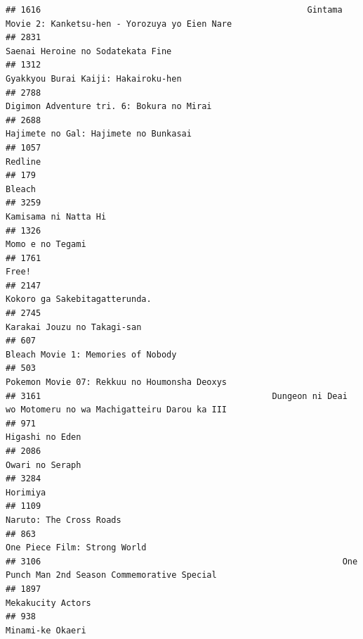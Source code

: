 \documentclass[
]{article}
\begin{document}
\begin{verbatim}
## 1616                                                     Gintama Movie 2: Kanketsu-hen - Yorozuya yo Eien Nare
## 2831                                                                         Saenai Heroine no Sodatekata Fine
## 1312                                                                       Gyakkyou Burai Kaiji: Hakairoku-hen
## 2788                                                                 Digimon Adventure tri. 6: Bokura no Mirai
## 2688                                                                     Hajimete no Gal: Hajimete no Bunkasai
## 1057                                                                                                   Redline
## 179                                                                                                     Bleach
## 3259                                                                                      Kamisama ni Natta Hi
## 1326                                                                                          Momo e no Tegami
## 1761                                                                                                     Free!
## 2147                                                                             Kokoro ga Sakebitagatterunda.
## 2745                                                                               Karakai Jouzu no Takagi-san
## 607                                                                         Bleach Movie 1: Memories of Nobody
## 503                                                               Pokemon Movie 07: Rekkuu no Houmonsha Deoxys
## 3161                                              Dungeon ni Deai wo Motomeru no wa Machigatteiru Darou ka III
## 971                                                                                            Higashi no Eden
## 2086                                                                                           Owari no Seraph
## 3284                                                                                                  Horimiya
## 1109                                                                                   Naruto: The Cross Roads
## 863                                                                               One Piece Film: Strong World
## 3106                                                            One Punch Man 2nd Season Commemorative Special
## 1897                                                                                         Mekakucity Actors
## 938                                                                                           Minami-ke Okaeri

\end{verbatim}
\end{document}
